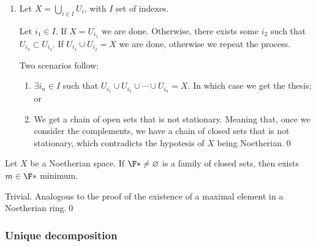 \documentclass{subfiles}
\begin{document}
\begin{proof*}
\begin{enumerate}
                Now we know that \(\exists s \in \N\) such that \(Y_{s} = Y_{s + 1} = \cdots\) and 
                    \(\exists t \in \N\) such that \(Z_{t} = Z_{t + 1} = \cdots\). Hence, 
                    if \(m = \max{s, t}\) we have that \(Y_{m} = Y_{Y + 1} = \cdots\) and 
                    \(Z_{m} = Z_{m  + 1} = \cdots\). But for all \(i\), it holds 
                    \[
                        X_{i} = (Y \cap X_{i}) \cup (Z \cap X_{i}) = (Y \cup Z) \cap X_{i}
                    \]
                    by which \(X_{m} = X_{m + 1} = \cdots\), meaning that \(X\) is Noetherian.

                \item Let \(X = \bigcup_{i \in I} U_{i}\), with \(I\) set of indexes.

                    Let \(i_{1} \in I\). If \(X = U_{i_{1}}\) we are done.
                    Otherwise, there exists some \(i_{2}\) such that \(U_{i_{2}} \subset U_{i_{2}}\).
                    If \(U_{i_{1}} \cup U_{i_{2}} = X\) we are done, otherwise we repeat the process.

                    Two scenarios follow:
                    \begin{enumerate}
                        \item \(\exists i_{n} \in I\) such that \(U_{i_{1}} \cup U_{i_{2}} \cup \cdots \cup U_{i_{n}} = X\).
                            In which case we get the thesis; or 
                        \item We get a chain of open sets that is not stationary. Meaning that,
                            once we consider the complements, we have a chain of closed sets that is
                            not stationary, which contradicts the hypotesis of \(X\) being Noetherian.\qed
                    \end{enumerate}
            \end{enumerate}
    \end{proof*}


    \begin{lemma*}
        Let \(X\) be a Noetherian space. If \(\F* \ne \varnothing\) is a family of closed sets,
        then exists \(m \in \F*\) minimum.
    \end{lemma*}

    \begin{proof*}
        Trivial. Analogous to the proof of the existence of a maximal element in a Noetherian ring.\qed
    \end{proof*}

    \subsubsection{Unique decomposition}
    
\end{document}
